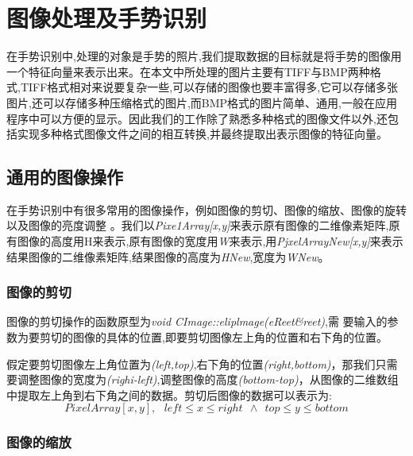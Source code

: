 \documentclass{XDBAthesis}
\begin{document}
\else
\fi
{}

\lstset{numbers=left,
extendedchars=false,
escapechar=@,style=customc
}
\chapter{图像处理及手势识别}

在手势识别中,处理的对象是手势的照片\cite{郭兴伟2003基于视觉的手势识别算法研究},我们提取数据的目标就是将手势的图像用一个特征向量来表示出来。在本文中所处理的图片主要有TIFF与BMP两种格式,TIFF格式相对来说要复杂一些,可以存储的图像也要丰富得多,它可以存储多张图片,还可以存储多种压缩格式的图片,而BMP格式的图片简单、通用,一般在应用程序中可以方便的显示。因此我们的工作除了熟悉多种格式的图像文件以外,还包括实现多种格式图像文件之间的相互转换,并最终提取出表示图像的特征向量。

\section{通用的图像操作}

    在手势识别中有很多常用的图像操作，例如图像的剪切、图像的缩放、图像的旋转以及图像的亮度调整\cite{何阳清2004基于几何特征的手势识别算法研究} 。我们以\emph{Pixe1Array[x,y]}来表示原有图像的二维像素矩阵,原有图像的高度用H来表示,原有图像的宽度用\emph{W}来表示,用\emph{PjxelArrayNew[x,y]}来表示结果图像的二维像素矩阵,结果图像的高度为\emph{HNew},宽度为\emph{WNew}。

\subsection{图像的剪切}

    图像的剪切操作的函数原型为\emph{void CImage::eliplmage(eReet\&reet)},需
要输入的参数为要剪切的图像的具体的位置,即要剪切图像左上角的位置和右下角的位置。

假定要剪切图像左上角位置为\emph{(left,top)},右下角的位置\emph{(right,bottom)}，那我们只需要调整图像的宽度为\emph{(righi-left)},调整图像的高度\emph{(bottom-top)}，从图像的二维数组中提取左上角到右下角之间的数据。剪切后图像的数据可以表示为:
$$
    PixelArray[x,y] ,\ \ \ left\leq x \leq right \ \ \wedge\ \  top \leq y \leq bottom
$$
\subsection{图像的缩放}
\end{document}
